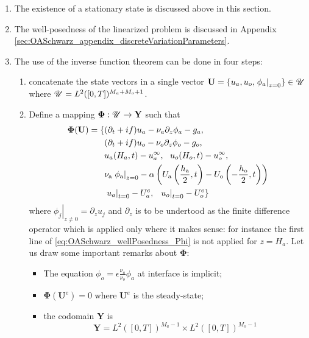 \begin{enumerate}
	\item The existence of a stationary state is discussed above
		in this section.
	\item The well-posedness of the linearized
		problem is discussed in Appendix
	\ref{sec:OASchwarz_appendix_discreteVariationParameters}.
	\item The use of the inverse function theorem can be
		done in four steps:
	\begin{enumerate}
		\item concatenate the state vectors
			in a single vector $\mathbf{U}=
			\{u_a, u_o, \left.\phi_a\right|_{z=0}\}
			\in \mathbf{\cal U}$
		where $\mathbf{\cal U} = L^2([0,T])^{M_a+M_o+1}$.
		\item
	Define a mapping
	$\mathbf{\Phi}: \mathbf{\cal U}\rightarrow \mathbf{Y}$
	such that
\begin{equation}
	\label{eq:OASchwarz_wellPosedness_Phi}
\begin{aligned}
	\mathbf{\Phi}(\mathbf{U}) =
	\{&(\partial_t + if) u_a - \nu_a\partial_z \phi_a - g_a, \\
	&(\partial_t + if) u_o - \nu_o\partial_z \phi_o - g_o, \\
	&u_a(H_a, t) - u^\infty_a, ~~ u_o(H_o, t) - u^\infty_o, \\
	&\nu_{\rm a}\left.\phi_{\rm a}\right|_{z=0} - \alpha
	\left( U_{\rm a}\left(\frac{h_{\rm a}}{2},
	t\right) - U_{\rm o}\left(-\frac{h_{\rm o}}{2},
	t\right)\right) \\
	&\left.u_a\right|_{t=0} - U^e_{a}, ~~
	\left.u_o\right|_{t=0} - U^e_{o}\}
\end{aligned}
\end{equation}
where $\left.\phi_j\right|_{z\neq 0} = \partial_z u_j$
and $\partial_z$ is to be undertood as the finite difference
operator which is applied only where it makes sense:
for instance the first line of \eqref{eq:OASchwarz_wellPosedness_Phi}
is not applied for $z=H_a$.
Let us draw some important remarks about $\mathbf{\Phi}$:
\begin{itemize}
 \item The equation $\phi_o = \epsilon \frac{\nu_a}{\nu_o}\phi_a$
	 at interface is implicit;
 \item $\mathbf{\Phi}(\mathbf{U}^e)=0$
 	where $\mathbf{U}^e$
 	is the steady-state;
 \item the codomain $\mathbf{Y}$ is
 	\begin{equation}
		\mathbf{Y}=L^2([0,T])^{M_a-1}
			\times L^2([0,T])^{M_o-1}

\end{equation}
\end{itemize}
\end{enumerate}
\end{enumerate}
